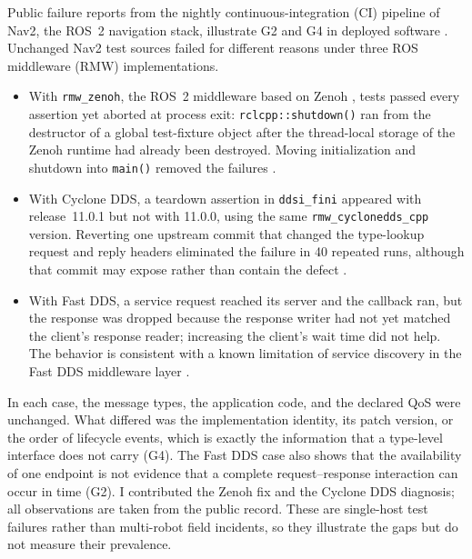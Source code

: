 Public failure reports from the nightly continuous-integration (CI) pipeline of
Nav2, the ROS~2 navigation stack, illustrate G2 and G4 in deployed software
\cite{nav2issue6163}.  Unchanged Nav2 test sources failed for different reasons
under three ROS middleware (RMW) implementations.
\begin{itemize}
  \item With \texttt{rmw\_zenoh}, the ROS~2 middleware based on Zenoh
    \cite{corsaro2023zenoh}, tests passed every assertion yet aborted at
    process exit: \texttt{rclcpp::shutdown()} ran from the destructor of a
    global test-fixture object after the thread-local storage of the Zenoh
    runtime had already been destroyed.  Moving initialization and shutdown
    into \texttt{main()} removed the failures \cite{nav2pr4948,nav2pr6241}.
  \item With Cyclone DDS, a teardown assertion in \texttt{ddsi\_fini} appeared
    with release~11.0.1 but not with 11.0.0, using the same
    \texttt{rmw\_cyclonedds\_cpp} version.  Reverting one upstream commit that
    changed the type-lookup request and reply headers eliminated the failure in
    40 repeated runs, although that commit may expose rather than contain the
    defect \cite{cyclonedds2426}.
  \item With Fast DDS, a service request reached its server and the callback
    ran, but the response was dropped because the response writer had not yet
    matched the client's response reader; increasing the client's wait time did
    not help.  The behavior is consistent with a known limitation of service
    discovery in the Fast DDS middleware layer
    \cite{nav2issue6163,fastrtps392}.
\end{itemize}

In each case, the message types, the application code, and the declared QoS
were unchanged.  What differed was the implementation identity, its patch
version, or the order of lifecycle events, which is exactly the information
that a type-level interface does not carry (G4).  The Fast DDS case also shows
that the availability of one endpoint is not evidence that a complete
request--response interaction can occur in time (G2).  I contributed the
Zenoh fix and the Cyclone DDS diagnosis; all observations are taken from the
public record.  These are single-host test failures rather than multi-robot
field incidents, so they illustrate the gaps but do not measure their
prevalence.
